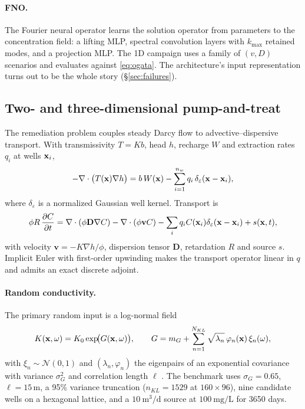 \paragraph{FNO.} The Fourier neural operator \citep{li2020fourier} learns the
solution operator from parameters to the concentration field: a lifting MLP,
spectral convolution layers with $k_{\max}$ retained modes, and a projection
MLP. The 1D campaign uses a family of $(v,D)$ scenarios and evaluates against
\eqref{eq:ogata}. The architecture's input representation turns out to be the
whole story (\S\ref{sec:failures}).

\subsection{Two- and three-dimensional pump-and-treat}
\label{sec:case-opt}

The remediation problem couples steady Darcy flow to advective--dispersive
transport. With transmissivity $T=Kb$, head $h$, recharge $W$ and extraction
rates $q_i$ at wells $\mathbf{x}_i$,
\begin{equation}
-\nabla\cdot\bigl(T(\mathbf{x})\nabla h\bigr)
=b\,W(\mathbf{x})-\sum_{i=1}^{n_w}q_i\,\delta_\varepsilon(\mathbf{x}-\mathbf{x}_i),
\label{eq:darcy}
\end{equation}
where $\delta_\varepsilon$ is a normalized Gaussian well kernel. Transport is
\begin{equation}
\phi R\,\frac{\partial C}{\partial t}
=\nabla\cdot(\phi\mathbf{D}\nabla C)
-\nabla\cdot(\phi\mathbf{v}C)
-\sum_i q_i C(\mathbf{x}_i)\delta_\varepsilon(\mathbf{x}-\mathbf{x}_i)+s(\mathbf{x},t),
\label{eq:transport}
\end{equation}
with velocity $\mathbf{v}=-K\nabla h/\phi$, dispersion tensor $\mathbf{D}$,
retardation $R$ and source $s$. Implicit Euler with first-order upwinding makes
the transport operator linear in $q$ and admits an exact discrete adjoint.

\paragraph{Random conductivity.} The primary random input is a log-normal field
\begin{equation}
K(\mathbf{x},\omega)=K_0\exp\!\bigl(G(\mathbf{x},\omega)\bigr),
\qquad
G=m_G+\sum_{n=1}^{N_{KL}}\sqrt{\lambda_n}\,\varphi_n(\mathbf{x})\,\xi_n(\omega),
\label{eq:kl}
\end{equation}
with $\xi_n\sim\mathcal{N}(0,1)$ and $(\lambda_n,\varphi_n)$ the eigenpairs of
an exponential covariance with variance $\sigma_G^2$ and correlation length
$\ell$ \citep{ghanem1991stochastic}. The benchmark uses
$\sigma_G=0.65$, $\ell=15$\,m, a 95\% variance truncation
($n_{KL}=1529$ at $160\times96$), nine candidate wells on a hexagonal lattice,
and a $10\ \mathrm{m^3/d}$ source at $100\ \mathrm{mg/L}$ for 3650 days.

